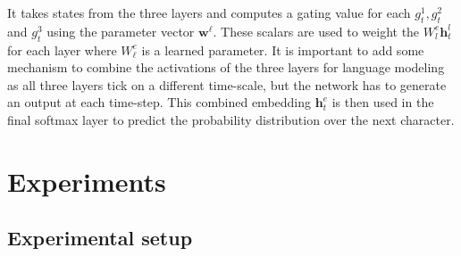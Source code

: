It takes states from the three layers and computes a gating value for each 
$g^1_t, g^2_t$ and $g^3_t$ using the parameter vector $\mathbf{w}^\ell$. These scalars are used to weight the  $W^e_l \mathbf{h}^l_t$
for each layer where $W^e_\ell$ is a learned parameter. 
It is important
to add some mechanism to combine the activations of the three layers for language modeling as all three layers tick on a different time-scale, but the network has to generate an output at each time-step. This combined embedding $\mathbf{h}^e_t$ is then used in the final softmax layer to predict the probability distribution over the next character.





\section{Experiments}

\subsection{Experimental setup}

